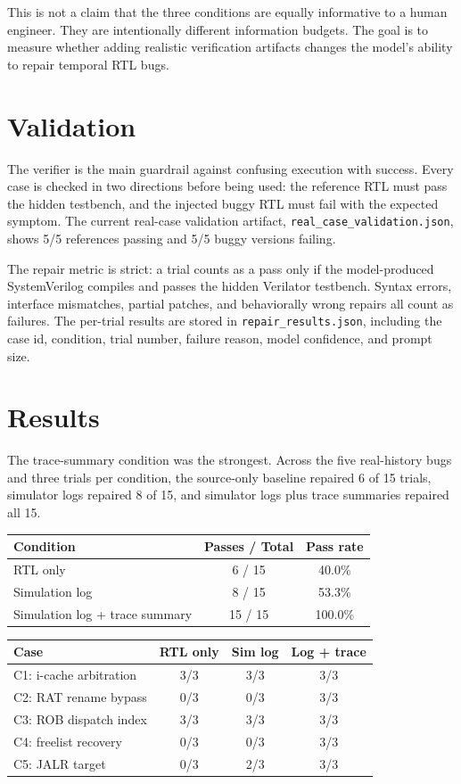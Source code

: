 \documentclass[11pt]{article}
\begin{document}
This is not a claim that the three conditions are equally informative to a human
engineer. They are intentionally different information budgets. The goal is to
measure whether adding realistic verification artifacts changes the model's
ability to repair temporal RTL bugs.

\section*{Validation}
The verifier is the main guardrail against confusing execution with success.
Every case is checked in two directions before being used: the reference RTL
must pass the hidden testbench, and the injected buggy RTL must fail with the
expected symptom. The current real-case validation artifact,
\texttt{real\_case\_validation.json}, shows 5/5 references passing and 5/5
buggy versions failing.

The repair metric is strict: a trial counts as a pass only if the model-produced
SystemVerilog compiles and passes the hidden Verilator testbench. Syntax errors,
interface mismatches, partial patches, and behaviorally wrong repairs all count
as failures. The per-trial results are stored in \texttt{repair\_results.json},
including the case id, condition, trial number, failure reason, model
confidence, and prompt size.

\section*{Results}
The trace-summary condition was the strongest. Across the five real-history
bugs and three trials per condition, the source-only baseline repaired 6 of 15
trials, simulator logs repaired 8 of 15, and simulator logs plus trace summaries
repaired all 15.

\begin{center}
\begin{tabular}{lcc}
\toprule
Condition & Passes / Total & Pass rate \\
\midrule
RTL only & 6 / 15 & 40.0\% \\
Simulation log & 8 / 15 & 53.3\% \\
Simulation log + trace summary & 15 / 15 & 100.0\% \\
\bottomrule
\end{tabular}
\end{center}

\begin{center}
\small
\begin{tabular}{lccc}
\toprule
Case & RTL only & Sim log & Log + trace \\
\midrule
C1: i-cache arbitration & 3/3 & 3/3 & 3/3 \\
C2: RAT rename bypass & 0/3 & 0/3 & 3/3 \\
C3: ROB dispatch index & 3/3 & 3/3 & 3/3 \\
C4: freelist recovery & 0/3 & 0/3 & 3/3 \\
C5: JALR target & 0/3 & 2/3 & 3/3 \\
\bottomrule
\end{tabular}
\end{center}
\end{document}
